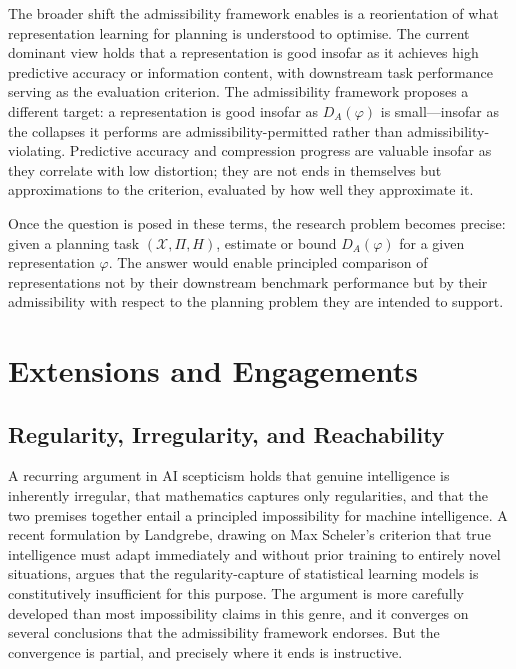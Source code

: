 \documentclass[11pt, a4paper]{article}
\theoremstyle{plain}
\theoremstyle{definition}
\theoremstyle{remark}
\newcommand{\DA}{D_A(\varphi)}
\begin{document}
The broader shift the admissibility framework enables is a reorientation of what
representation learning for planning is understood to optimise. The current
dominant view holds that a representation is good insofar as it achieves high
predictive accuracy or information content, with downstream task performance
serving as the evaluation criterion. The admissibility framework proposes a
different target: a representation is good insofar as $\DA$ is small---insofar
as the collapses it performs are admissibility-permitted rather than
admissibility-violating. Predictive accuracy and compression progress are valuable
insofar as they correlate with low distortion; they are not ends in themselves
but approximations to the criterion, evaluated by how well they approximate it.

Once the question is posed in these terms, the research problem becomes
precise: given a planning task $(\mathcal{X}, \Pi, H)$, estimate or bound $\DA$
for a given representation $\varphi$. The answer would enable principled
comparison of representations not by their downstream benchmark performance but
by their admissibility with respect to the planning problem they are intended to
support.

\section{Extensions and Engagements}

\subsection{Regularity, Irregularity, and Reachability}

A recurring argument in AI scepticism holds that genuine intelligence is inherently irregular, that mathematics captures only regularities, and that the two premises together entail a principled impossibility for machine intelligence. A recent formulation by Landgrebe, drawing on Max Scheler's criterion that true intelligence must adapt immediately and without prior training to entirely novel situations, argues that the regularity-capture of statistical learning models is constitutively insufficient for this purpose. The argument is more carefully developed than most impossibility claims in this genre, and it converges on several conclusions that the admissibility framework endorses. But the convergence is partial, and precisely where it ends is instructive.
\end{document}
